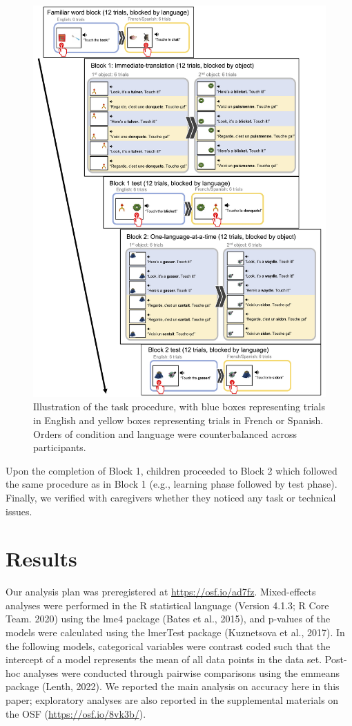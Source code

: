\documentclass[
  man,floatsintext]{apa7}
\begin{document}
\begin{figure}[H]

{\centering \includegraphics[width=0.9\linewidth]{figure/figure2} 

}

\caption{Illustration of the task procedure, with blue boxes representing trials in English and yellow boxes representing trials in French or Spanish. Orders of condition and language were counterbalanced across participants.   }\label{fig:Figure2}
\end{figure}

Upon the completion of Block 1, children proceeded to Block 2 which followed the same procedure as in Block 1 (e.g., learning phase followed by test phase). Finally, we verified with caregivers whether they noticed any task or technical issues.

\hypertarget{results}{%
\section{Results}\label{results}}

Our analysis plan was preregistered at \url{https://osf.io/ad7fz}. Mixed-effects analyses were performed in the R statistical language (Version 4.1.3; R Core Team. 2020) using the lme4 package (Bates et al., 2015), and p-values of the models were calculated using the lmerTest package (Kuznetsova et al., 2017). In the following models, categorical variables were contrast coded such that the intercept of a model represents the mean of all data points in the data set. Post-hoc analyses were conducted through pairwise comparisons using the emmeans package (Lenth, 2022). We reported the main analysis on accuracy here in this paper; exploratory analyses are also reported in the supplemental materials on the OSF (\url{https://osf.io/8vk3b/}).
\end{document}
